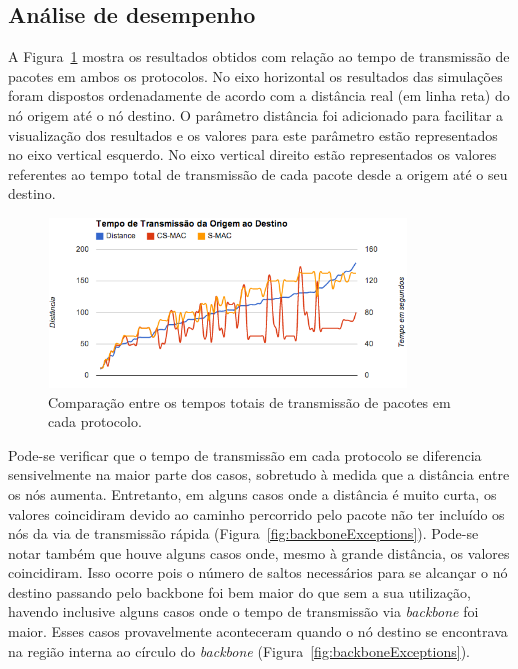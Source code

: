 \subsection{Análise de desempenho}

A Figura~\ref{fig:transmissionTimeComparison} mostra os resultados obtidos com relação ao tempo de transmissão de pacotes em ambos os protocolos. No eixo horizontal os resultados das simulações foram dispostos ordenadamente de acordo com a distância real (em linha reta) do nó origem até o nó destino. O parâmetro distância foi adicionado para facilitar a visualização dos resultados e os valores para este parâmetro estão representados no eixo vertical esquerdo. No eixo vertical direito estão representados os valores referentes ao tempo total de transmissão de cada pacote desde a origem até o seu destino. 

\begin{figure}[!htb]
\centering
\includegraphics[width=360px,height=170px]{./Pictures/TransmissionTimeComparison.png}
\caption{Comparação entre os tempos totais de transmissão de pacotes em cada protocolo.} %
\label{fig:transmissionTimeComparison} %
\end{figure}

Pode-se verificar que o tempo de transmissão em cada protocolo se diferencia sensivelmente na maior parte dos casos, sobretudo à medida que a distância entre os nós aumenta. Entretanto, em alguns casos onde a distância é muito curta, os valores coincidiram devido ao caminho percorrido pelo pacote não ter incluído os nós da via de transmissão rápida (Figura~\ref{fig:backboneExceptions}). Pode-se notar também que houve alguns casos onde, mesmo à grande distância, os valores coincidiram. Isso ocorre pois o número de saltos necessários para se alcançar o nó destino passando pelo backbone foi bem maior do que sem a sua utilização, havendo inclusive alguns casos onde o tempo de transmissão via \emph{backbone} foi maior. Esses casos provavelmente aconteceram quando o nó destino se encontrava na região interna ao círculo do \emph{backbone} (Figura~\ref{fig:backboneExceptions}).

